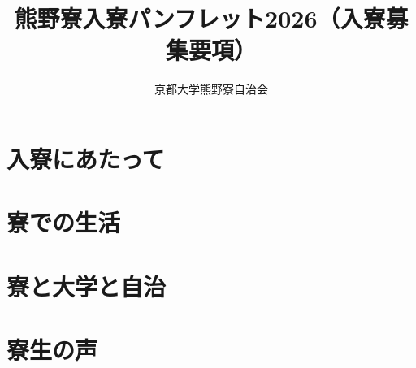 \documentclass[10pt,a4j,dvipdfmx,openany,uplatex]{jsbook}
\title{熊野寮入寮パンフレット2026（入寮募集要項）}
\author{京都大学熊野寮自治会}
\date{}
\begin{document}

  {\small
  \setcounter{tocdepth}{1}%
  \tableofcontents
  }

 
\chapter{入寮にあたって}


  

  \vspace{10mm}

  

  \newpage
  



\chapter{寮での生活}

  

  \newpage

  

  \newpage

  

  \newpage
  
  
  
  \newpage
  
  

  

\chapter{寮と大学と自治}
  
  \clearpage
  
  \clearpage
  
  \clearpage
  

  \newpage
  
  

\chapter{寮生の声}

\newpage

\newpage

\end{document}
